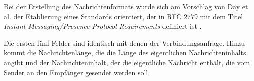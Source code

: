 \noindent Bei der Erstellung des Nachrichtenformats wurde sich am Vorschlag von Day et al. der Etablierung eines Standards orientiert, der in RFC $2779$ mit dem Titel \textit{Instant Messaging/Presence Protocol Requirements} definiert ist \Parencite[S. 9]{rfc2779_IMPP}. 

Die ersten fünf Felder sind identisch mit denen der Verbindungsanfrage. Hinzu kommt die Nachrichtenlänge, die die Länge des eigentlichen Nachrichteninhalts angibt und der Nachrichteninhalt, der die eigentliche Nachricht enthält, die vom Sender an den Empfänger gesendet werden soll.

